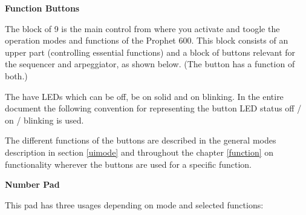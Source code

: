 \documentclass[landscape, 11pt, oneside]{report}
\newenvironment{flowtext}{\addmargin[0cm]{7cm}}{\endaddmargin} %
\begin{document}
\begin{flowtext}
\textbf{Function Buttons}

The block of 9 \funcbuttons is the main control from where you activate and toogle the operation modes and functions of the Prophet 600. This block consists of an upper part (controlling essential functions) and a block of buttons relevant for the sequencer and arpeggiator, as shown below. (The \record button has a function of both.)


The \funcbuttons have LEDs which can be off, be on solid and on blinking. In the entire document the following convention for representing the button LED status off / on / blinking is used.


The different functions of the buttons are described in the general modes description in section \ref{uimode} and throughout the chapter \ref{function} on functionality wherever the buttons are used for a specific function. 

\textbf{Number Pad}

This pad has three usages depending on mode and selected functions:


\end{flowtext}
\end{document}
